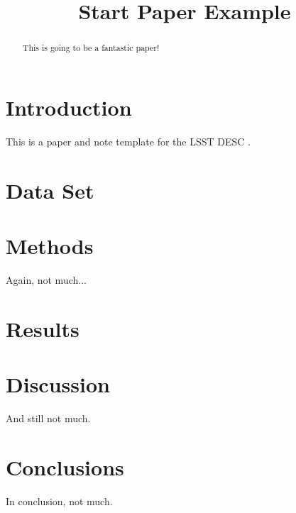 \documentclass[iop,revtex4-1,preprint]{aastex}
\begin{document}
 

\title{Start Paper Example}


\begin{abstract}

This is going to be a fantastic paper!

\end{abstract}

\maketitle

\section{Introduction}
\label{sec:intro}

This is a paper and note template for the LSST DESC \citep{Overview,ScienceBook,WhitePaper}. 

\section{Data Set}
\label{sec:data}



\section{Methods}
\label{sec:methods}

Again, not much...

\section{Results}
\label{sec:results}


%

\section{Discussion}
\label{sec:discussion}

And still not much.

\section{Conclusions}
\label{sec:conclusions}

In conclusion, not much.





\end{document}
